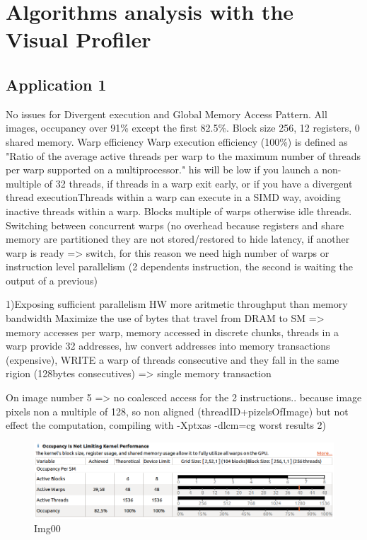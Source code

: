 \documentclass[a4paper]{article}
\begin{document}
\section{Algorithms analysis with the Visual Profiler}
\label{sec:vp}

\subsection{Application 1}
\label{sec:a1}
No issues for Divergent execution and Global Memory Access Pattern. All images, occupancy over 91\% except the first 82.5\%. Block size 256, 12 registers, 0 shared memory. Warp efficiency 
Warp execution efficiency (100\%) is defined as "Ratio of the average active threads per warp to the maximum number of threads per warp supported on a multiprocessor." his will be low if you launch a non-multiple of 32 threads, if threads in a warp exit early, or if you have a divergent thread executionThreads within a warp can execute in a SIMD way, avoiding inactive threads within a warp.
Blocks multiple of warps otherwise idle threads. Switching between concurrent warps (no overhead because registers and share memory are partitioned they are not stored/restored  to hide latency, if another warp is ready => switch, for this reason we need high number of warps or instruction level parallelism (2 dependents instruction, the second is waiting the output of a previous)

1)Exposing sufficient parallelism
HW more aritmetic throughput than memory bandwidth
Maximize the use of bytes that travel from DRAM to SM => memory accesses per warp, memory accessed in discrete chunks, threads in a warp provide 32 addresses, hw convert addresses into memory transactions (expensive), 
WRITE
a warp of threads consecutive and they fall in the same rigion (128bytes consecutives) => single memory transaction

On image number 5 => no coalesced access for the 2 instructions.. because image pixels non a multiple of 128, so non aligned (threadID+pizelsOfImage) but not effect the computation, compiling with -Xptxas -dlcm=cg worst results
2) 

\begin{figure}[ht]
    \centering
    \includegraphics[width=0.7\linewidth]{profiling/darker/darker_occupancy_00}
    \caption{Img00}
    \label{fig:histo}
\end{figure}
\FloatBarrier
\end{document}
